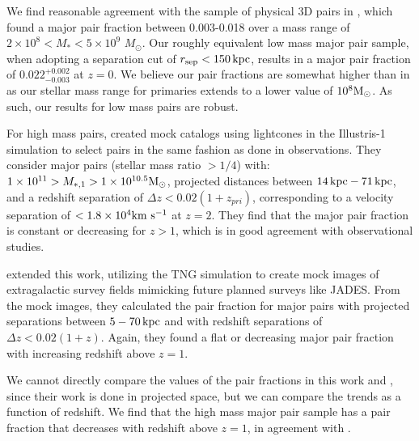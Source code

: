 \documentclass[linenumbers,twocolumn]{aastex631}
\begin{document}
        We find reasonable agreement with the sample of physical 3D pairs in \cite{Besla2018}, which found a major pair fraction between 0.003-0.018 over a mass range of $2\times 10^8 < M_* < 5 \times 10^9$ $M_\odot$.
        Our roughly equivalent low mass major pair sample, when adopting a separation cut of $r_{\mathrm{sep}}<150\mathrm{\,kpc}$, results in a major pair fraction of $0.022^{+0.002}_{-0.003}$ at $z=0$. We believe our pair fractions are somewhat higher than in \cite{Besla2018} as our stellar mass range for primaries extends to a lower value of $10^8\mathrm{M}_\odot$. As such, our results for low mass pairs are robust.  

        For high mass pairs, \citet{Snyder2017} created mock catalogs using lightcones in the Illustris-1 simulation to select pairs in the same fashion as done in observations. 
        They consider major pairs (stellar mass ratio $>1/4$) with: $1\times 10^{11}>M_{*,1} >1\times 10^{10.5}\mathrm{M}_\odot$, projected distances between $14\mathrm{\,kpc}-71\mathrm{\,kpc}$, and a redshift separation of $\Delta z<0.02(1+z_{pri})$, corresponding to a velocity separation of $<1.8\times10^4\mathrm{km}~\mathrm{s}^{-1}$ at $z=2$. 
        They find that the major pair fraction is constant or decreasing for $z>1$, which is in good agreement with observational studies.
        
        \citet{Snyder2023} extended this work, utilizing the TNG simulation to create mock images of extragalactic survey fields mimicking future planned surveys like JADES.
        From the mock images, they calculated the pair fraction for major pairs with projected separations between $5-70 \mathrm{\,kpc}$ and with redshift separations of $\Delta z< 0.02(1+z)$. 
        Again, they found a flat or decreasing major pair fraction with increasing redshift above $z=1$. 
        
        We cannot directly compare the values of the pair fractions in this work and \citet{Snyder2023}, since their work is done in projected space, but we can compare the trends as a function of redshift. 
        We find that the high mass major pair sample has a pair fraction that decreases with redshift above $z=1$, in agreement with \cite{Snyder2023}.
\end{document}
